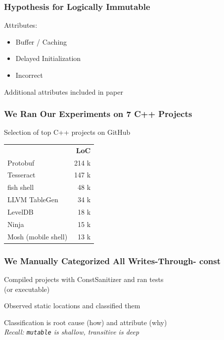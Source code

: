 \documentclass[aspectratio=43]{beamer}
\newcommand{\const}{{\color{blue} \bfseries \ttfamily const}}
\begin{document}
  \begin{frame}
    \frametitle{Hypothesis for Logically Immutable}
    \large
    Attributes:
    \vspace{1mm}
    \begin{itemize}
      \setlength\itemsep{0.5em}
      \item Buffer / Caching
      \item Delayed Initialization
      \item Incorrect
    \end{itemize}

    \vspace{2em}
    Additional attributes included in paper
  \end{frame}

  \begin{frame}
    \frametitle{We Ran Our Experiments on 7 C++ Projects}
    \large
    Selection of top C++ projects on GitHub

    \centering
    \vspace{1.5em}
    \begin{tabular}{l r}
      & \textbf{LoC} \\

      Protobuf & 214 k\\
      Tesseract & 147 k \\
      fish shell & 48 k \\
      LLVM TableGen & 34 k \\
      LevelDB & 18 k \\
      Ninja & 15 k \\
      Mosh (mobile shell) & 13 k \\
    \end{tabular}
  \end{frame}

  \begin{frame}
    \frametitle{We Manually Categorized All Writes-Through-\const{}}
    \large
    Compiled projects with ConstSanitizer and ran tests\\(or executable)

    \vspace{2em}
    Observed static locations and classified them

    \vspace{2em}
    Classification is root cause (how) and attribute (why)\\
    \textit{Recall: \texttt{mutable} is shallow, transitive is deep}
  \end{frame}
\end{document}
